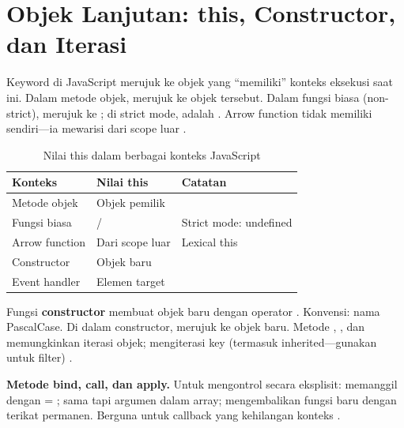 \section{Objek Lanjutan: this, Constructor, dan Iterasi}

Keyword  di JavaScript merujuk ke objek yang ``memiliki'' konteks eksekusi saat ini. Dalam metode objek,  merujuk ke objek tersebut. Dalam fungsi biasa (non-strict),  merujuk ke ; di strict mode,  adalah . Arrow function tidak memiliki  sendiri---ia mewarisi dari scope luar \cite{jsInfo}.

\begin{table}[htbp]
\centering
\begin{tabular}{|P{3.5cm}|P{4cm}|P{4.5cm}|}
\hline
\textbf{Konteks} & \textbf{Nilai this} & \textbf{Catatan} \\
\hline
Metode objek & Objek pemilik &  \\
\hline
Fungsi biasa &  /  & Strict mode: undefined \\
\hline
Arrow function & Dari scope luar & Lexical this \\
\hline
Constructor & Objek baru &  \\
\hline
Event handler & Elemen target &  \\
\hline
\end{tabular}
\caption{Nilai this dalam berbagai konteks JavaScript}
\end{table}

Fungsi \textbf{constructor} membuat objek baru dengan operator . Konvensi: nama PascalCase. Di dalam constructor,  merujuk ke objek baru. Metode , , dan  memungkinkan iterasi objek;  mengiterasi key (termasuk inherited---gunakan  untuk filter) \cite{mdnJsGuide}.

\begin{konsep}
\textbf{Metode bind, call, dan apply.} Untuk mengontrol  secara eksplisit:  memanggil  dengan  = ;  sama tapi argumen dalam array;  mengembalikan fungsi baru dengan  terikat permanen. Berguna untuk callback yang kehilangan konteks  \cite{jsInfo}.
\end{konsep}

